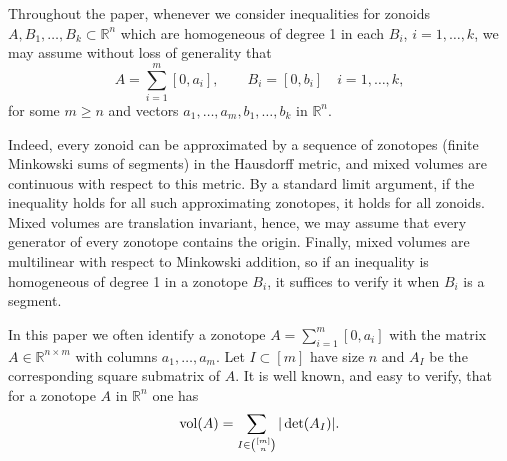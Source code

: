 \documentclass[11pt]{amsart}
\newcommand{\R}{\mathbb R}
\def\vol{{\rm vol}}
\theoremstyle{definition}
\theoremstyle{remark}
\newcommand{\Det}{\operatorname{Det}}
\newcommand{\onevec}{\mathbbm{1}}
\begin{document}
Throughout the paper, whenever we consider inequalities for zonoids $A, B_1, \dots, B_k \subset \mathbb{R}^n$ which are homogeneous of degree 1 in each $B_i$, $i=1,\dots,k$,
we may assume without loss of generality that
\begin{equation}\label{eq:settings}
A = \sum_{i=1}^{m} [0, a_i], \qquad B_i = [0, b_i] \quad i=1,\dots,k,
\end{equation}
for some $m \geq n$ and vectors
$a_1,\dots, a_m, b_1,\dots,b_k$ in $\R^n$. %

Indeed, every zonoid can be approximated by a sequence of zonotopes (finite Minkowski sums of segments) in the Hausdorff metric, and mixed volumes are continuous with respect to this metric. By a standard limit argument, if the inequality holds for all such approximating zonotopes, it holds for all zonoids.
Mixed volumes are translation invariant, hence, we may assume that every generator
of every zonotope contains the origin. Finally, mixed volumes are multilinear with respect to Minkowski addition, so if an inequality is homogeneous of degree 1 in a zonotope $B_i$, 
it suffices to verify it when $B_i$ is a segment.  



In this paper we often identify a zonotope $A = \sum_{i=1}^{m} [0, a_i]$ with the matrix
$A\in\R^{n\times m}$ with columns $a_1,\dots, a_m$. Let $I\subset [m]$ have size $n$ and
$A_I$ be the corresponding square submatrix of $A$. 
It is well known, and easy to verify, that for a zonotope $A$ in $\R^n$ one has
\begin{align} \label{vol:zon} 
\vol(A)  = \sum_{I \in \binom{[m]}{n}} |\det(A_I)|. %
\end{align}


%
\end{document}
